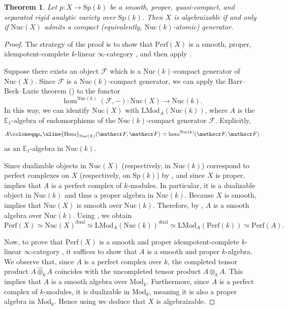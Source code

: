\documentclass[oneside, hidelinks, 12pt, a4paper,reqno]{amsart}
\theoremstyle{plain}
\newtheorem{theorem}{Theorem}[section]
\theoremstyle{definition}
\theoremstyle{plain}
\newcommand{\cF}{\mathscr F}
\newcommand{\Sp}{\mathrm{Sp}}
\newcommand{\Perf}{\mathrm{Perf}}
\newcommand{\cat}{$\infty$-category }
\newcommand{\Nuc}{\mathrm{Nuc}}
\newcommand{\Hom}{\mathrm{Hom}}
\newcommand{\Mod}{\mathrm{Mod}}
\newcommand{\LMod}{\mathrm{LMod}}
\begin{document}
\begin{theorem}\label{thm: algebraization via generator}
    Let $p\colon X \to \Sp(k)$ be a smooth, proper, quasi-compact, and separated rigid analytic variety over $\Sp(k)$. Then $X$ is algebraizable if and only if $\Nuc(X)$ admits a compact (equivalently, $\Nuc(k)$-atomic) generator.  
\end{theorem}
\begin{proof} 
    The strategy of the proof is to show that $\Perf(X)$ is a smooth, proper, idempotent-complete $k$-linear \cat, and then apply \cite[Theorem 3.1]{montagnani2025algebraizationrigidanalyticvarieties}.

    Suppose there exists an object $\cF$ which is a $\Nuc(k)$-compact generator of $\Nuc(X)$. Since $\cF$ is a $\Nuc(k)$-compact generator, we can apply the Barr--Beck--Lurie theorem (\cite[Proposition 4.8.5.8]{HA}) to the functor
    \[
    \hom^{\Nuc(k)}(\cF,-) \colon \Nuc(X) \to \Nuc(k).
    \]
    In this way, we can identify $\Nuc(X)$ with $\LMod_{A}(\Nuc(k))$, where $A$ is the $\mathbb{E}_{1}$-algebra of endomorphisms of the $\Nuc(k)$-compact generator $\cF$. Explicitly,
    \[
    A \coloneqq p_{\ast}\uline{\Hom}_{\Nuc(X)}(\cF,\cF) \simeq \hom^{\Nuc(k)}(\cF, \cF) 
    \]
    as an $\mathbb{E}_{1}$-algebra in $\Nuc(k)$.

    Since dualizable objects in $\Nuc(X)$ (respectively, in $\Nuc(k)$) correspond to perfect complexes on $X$ (respectively, on $\Sp(k)$) by , and since $X$ is proper, \cite[Proposition 7.8]{porta2018derivedhomspacesrigid} implies that $A$ is a perfect complex of $k$-modules. In particular, it is a dualizable object in $\Nuc(k)$ and thus a proper algebra in $\Nuc(k)$. Because $X$ is smooth,  implies that $\Nuc(X)$ is smooth over $\Nuc(k)$. Therefore, by , $A$ is a smooth algebra over $\Nuc(k)$. Using \cite[Proposition 4.6.4.4 and Proposition 4.6.4.12]{HA}, we obtain
    \[
    \Perf(X)\simeq \Nuc(X)^{\mathrm{dual}} \simeq \LMod_{A}(\Nuc(k))^{\mathrm{dual}}\simeq \LMod_{A}(\Perf(k)) \simeq \Perf(A).
    \]

    Now, to prove that $\Perf(X)$ is a smooth and proper idempotent-complete $k$-linear \cat, it suffices to show that $A$ is a smooth and proper $k$-algebra. We observe that, since $A$ is a perfect complex over $k$, the completed tensor product $A\widehat\otimes_{k}A$ coincides with the uncompleted tensor product $A\otimes_{k}A$. This implies that $A$ is a smooth algebra over $\Mod_{k}$. Furthermore, since $A$ is a perfect complex of $k$-modules, it is dualizable in $\Mod_{k}$, meaning it is also a proper algebra in $\Mod_{k}$. Hence using \cite[Theorem 3.1]{montagnani2025algebraizationrigidanalyticvarieties} we deduce that $X$ is algebraizable.


\end{proof}
\end{document}
